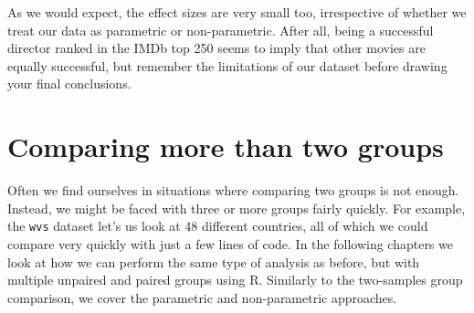 \documentclass[
]{book}
\newenvironment{Shaded}{\begin{snugshade}}{\end{snugshade}}
\newcommand{\AttributeTok}[1]{\textcolor[rgb]{0.77,0.63,0.00}{#1}}
\newcommand{\CommentTok}[1]{\textcolor[rgb]{0.56,0.35,0.01}{\textit{#1}}}
\newcommand{\ConstantTok}[1]{\textcolor[rgb]{0.00,0.00,0.00}{#1}}
\newcommand{\DocumentationTok}[1]{\textcolor[rgb]{0.56,0.35,0.01}{\textbf{\textit{#1}}}}
\newcommand{\FunctionTok}[1]{\textcolor[rgb]{0.00,0.00,0.00}{#1}}
\newcommand{\NormalTok}[1]{#1}
\newcommand{\OtherTok}[1]{\textcolor[rgb]{0.56,0.35,0.01}{#1}}
\newcommand{\SpecialCharTok}[1]{\textcolor[rgb]{0.00,0.00,0.00}{#1}}
\newcommand{\StringTok}[1]{\textcolor[rgb]{0.31,0.60,0.02}{#1}}
\begin{document}
\begin{Shaded}
\end{Shaded}

As we would expect, the effect sizes are very small too, irrespective of whether we treat our data as parametric or non-parametric. After all, being a successful director ranked in the IMDb top 250 seems to imply that other movies are equally successful, but remember the limitations of our dataset before drawing your final conclusions.

\hypertarget{comparing-more-than-two-groups}{%
\section{Comparing more than two groups}\label{comparing-more-than-two-groups}}

Often we find ourselves in situations where comparing two groups is not enough. Instead, we might be faced with three or more groups fairly quickly. For example, the \texttt{wvs} dataset let's us look at 48 different countries, all of which we could compare very quickly with just a few lines of code. In the following chapters we look at how we can perform the same type of analysis as before, but with multiple unpaired and paired groups using R. Similarly to the two-samples group comparison, we cover the parametric and non-parametric approaches.
\end{document}
